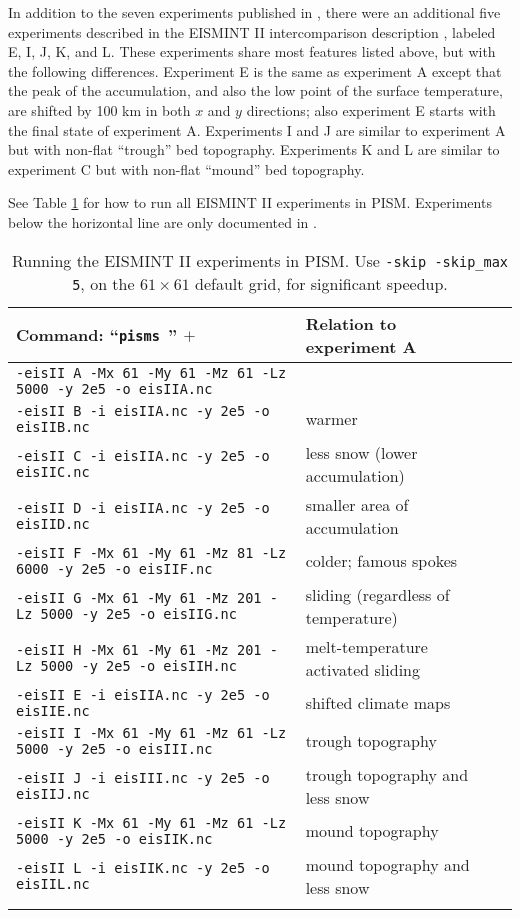 In addition to the seven experiments published in \cite{EISMINT00}, there were an additional five experiments described in the EISMINT II intercomparison description 
\cite{EISIIdescribe}, labeled E, I, J, K, and L.  These experiments share most features listed above, but with the following differences.  Experiment E is the same as experiment A except that the peak of the accumulation, and also the low point of the surface temperature, are shifted by 100 km in both $x$ and $y$ directions; also experiment E starts with the final state of experiment A.  Experiments I and J are similar to experiment A but with non-flat ``trough'' bed topography.  Experiments K and L are similar to experiment C but with non-flat ``mound'' bed topography.

See Table \ref{tab:eisII} for how to run all EISMINT II experiments in PISM.  Experiments below the horizontal line are only documented in \cite{EISIIdescribe}.

\begin{table}[ht]
\centering
\small
\begin{tabular}{@{}llll}\toprule
\textbf{Command: ``\texttt{pisms }'' $+$} & \textbf{Relation to experiment A} \\
\midrule
\texttt{-eisII A -Mx 61 -My 61 -Mz 61 -Lz 5000 -y 2e5 -o eisIIA.nc} & \\
\texttt{-eisII B -i eisIIA.nc -y 2e5 -o eisIIB.nc} & warmer \\
\texttt{-eisII C -i eisIIA.nc -y 2e5 -o eisIIC.nc} & less snow (lower accumulation)\\
\texttt{-eisII D -i eisIIA.nc -y 2e5 -o eisIID.nc} & smaller area of accumulation \\
\texttt{-eisII F -Mx 61 -My 61 -Mz 81 -Lz 6000 -y 2e5 -o eisIIF.nc} & colder; famous spokes \cite{BBL} \\
\texttt{-eisII G -Mx 61 -My 61 -Mz 201 -Lz 5000 -y 2e5 -o eisIIG.nc} & sliding (regardless of temperature) \\
\texttt{-eisII H -Mx 61 -My 61 -Mz 201 -Lz 5000 -y 2e5 -o eisIIH.nc} & melt-temperature activated sliding \\ \midrule
\texttt{-eisII E -i eisIIA.nc -y 2e5 -o eisIIE.nc} & shifted climate maps \\
\texttt{-eisII I -Mx 61 -My 61 -Mz 61 -Lz 5000 -y 2e5 -o eisIII.nc} & trough topography \\
\texttt{-eisII J -i eisIII.nc -y 2e5 -o eisIIJ.nc} & trough topography and less snow \\
\texttt{-eisII K -Mx 61 -My 61 -Mz 61 -Lz 5000 -y 2e5 -o eisIIK.nc} & mound topography \\
\texttt{-eisII L -i eisIIK.nc -y 2e5 -o eisIIL.nc} & mound topography and less snow \\
\bottomrule
\normalsize
\end{tabular}
\caption{Running the EISMINT II experiments in PISM.  Use \texttt{-skip -skip_max 5}, on the $61\times 61$ default grid, for significant speedup.}
\label{tab:eisII}
\end{table}

